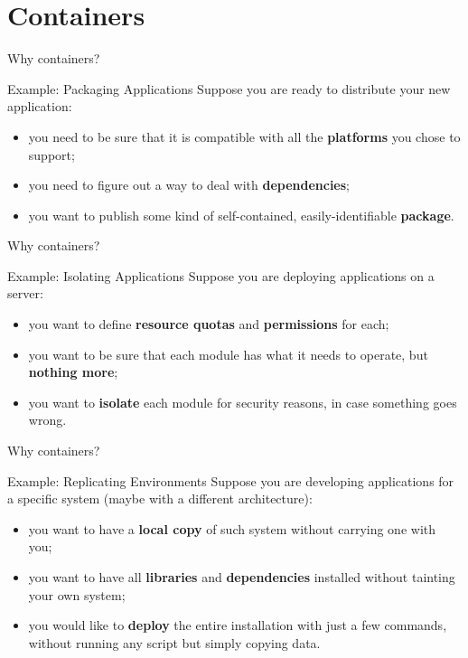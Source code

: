 
\section{Containers}
\graphicspath{{figs/section1/}}

\begin{frame}{Why containers?}
\begin{exampleblock}{Example: Packaging Applications}
  Suppose you are ready to distribute your new application:
  \begin{itemize}
    \item you need to be sure that it is compatible with all the \textbf{platforms} you chose to support;
    \item you need to figure out a way to deal with \textbf{dependencies};
    \item you want to publish some kind of self-contained, easily-identifiable \textbf{package}.
  \end{itemize}
\end{exampleblock}
\end{frame}
\begin{frame}{Why containers?}
\begin{exampleblock}{Example: Isolating Applications}
  Suppose you are deploying applications on a server:
  \begin{itemize}
    \item you want to define \textbf{resource quotas} and \textbf{permissions} for each;
    \item you want to be sure that each module has what it needs to operate, but \textbf{nothing more};
    \item you want to \textbf{isolate} each module for security reasons, in case something goes wrong.
  \end{itemize}
\end{exampleblock}
\end{frame}
\begin{frame}{Why containers?}
\begin{exampleblock}{Example: Replicating Environments}
  Suppose you are developing applications for a specific system (maybe with a different architecture):
  \begin{itemize}
    \item you want to have a \textbf{local copy} of such system without carrying one with you;
    \item you want to have all \textbf{libraries} and \textbf{dependencies} installed without tainting your own system;
    \item you would like to \textbf{deploy} the entire installation with just a few commands, without running any script but simply copying data.
  \end{itemize}
\end{exampleblock}
\end{frame}
